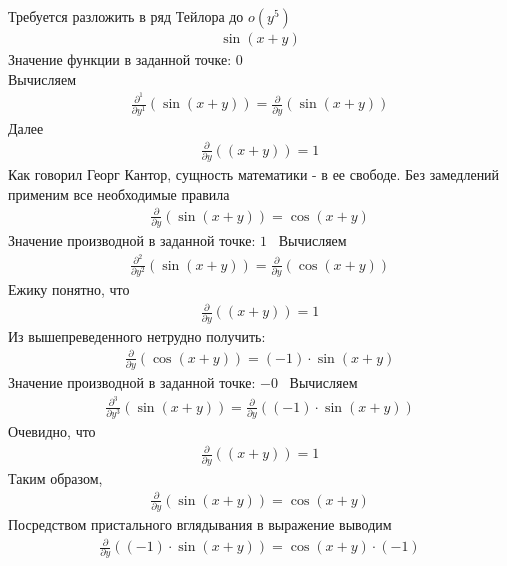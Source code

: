 \documentclass{article}
\begin{document}
Требуется разложить в ряд Тейлора до $o({y}^{5})$
\begin{gather}\sin{ \left(x + y\right) }
\end{gather}Значение функции в заданной точке: $0$ \\ 
Вычисляем
\begin{gather}
\frac{\partial ^{1}}{\partial {y}^{1}}\left(\sin{ \left(x + y\right) }\right)=\frac{\partial }{\partial y}\left(\sin{ \left(x + y\right) }\right)
\end{gather}
Далее
\begin{gather}
\frac{\partial }{\partial y}\left(\left(x + y\right)\right)=1
\end{gather}
Как говорил Георг Кантор, сущность математики - в ее свободе. Без замедлений применим все необходимые правила
\begin{gather}
\frac{\partial }{\partial y}\left(\sin{ \left(x + y\right) }\right)=\cos{ \left(x + y\right) }
\end{gather}
Значение производной в заданной точке: $1$ \ 
Вычисляем
\begin{gather}
\frac{\partial ^{2}}{\partial {y}^{2}}\left(\sin{ \left(x + y\right) }\right)=\frac{\partial }{\partial y}\left(\cos{ \left(x + y\right) }\right)
\end{gather}
Ежику понятно, что
\begin{gather}
\frac{\partial }{\partial y}\left(\left(x + y\right)\right)=1
\end{gather}
Из вышепреведенного нетрудно получить:
\begin{gather}
\frac{\partial }{\partial y}\left(\cos{ \left(x + y\right) }\right)=(-1) \cdot \sin{ \left(x + y\right) }
\end{gather}
Значение производной в заданной точке: $-0$ \ 
Вычисляем
\begin{gather}
\frac{\partial ^{3}}{\partial {y}^{3}}\left(\sin{ \left(x + y\right) }\right)=\frac{\partial }{\partial y}\left((-1) \cdot \sin{ \left(x + y\right) }\right)
\end{gather}
Очевидно, что
\begin{gather}
\frac{\partial }{\partial y}\left(\left(x + y\right)\right)=1
\end{gather}
Таким образом,
\begin{gather}
\frac{\partial }{\partial y}\left(\sin{ \left(x + y\right) }\right)=\cos{ \left(x + y\right) }
\end{gather}
Посредством пристального вглядывания в выражение выводим
\begin{gather}
\frac{\partial }{\partial y}\left((-1) \cdot \sin{ \left(x + y\right) }\right)=\cos{ \left(x + y\right) } \cdot (-1)
\end{gather}
\end{document}
